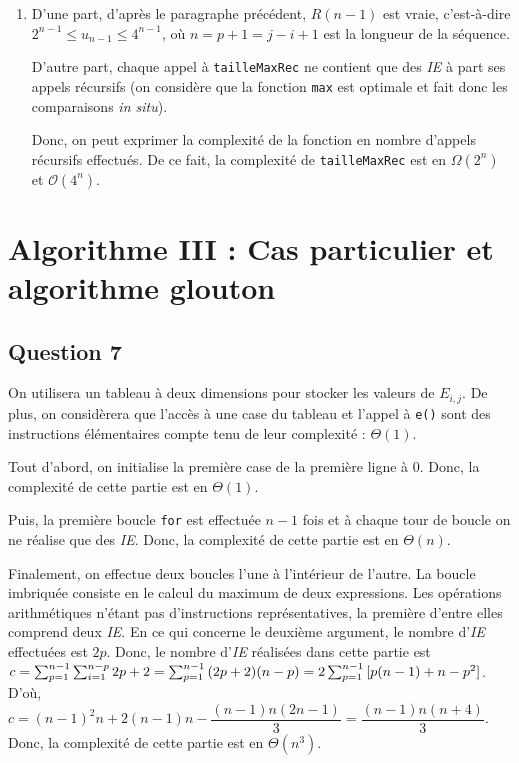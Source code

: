 \documentclass[12pt,a4paper]{article}
\begin{document}
\begin{enumerate}
\item D'une part, d'apr\`es le paragraphe pr\'ec\'edent, $R(n-1)$ est vraie, c'est-\`a-dire \( 2^{n-1} \leq u_{n-1} \leq 4^{n-1} \), o\`u \( n = p+1=j-i+1 \) est la longueur de la s\'equence. 

D'autre part, chaque appel \`a \texttt{tailleMaxRec} ne contient que des {\itshape IE} \`a part ses appels r\'ecursifs (on consid\`ere que la fonction \texttt{max} est optimale et fait donc les comparaisons {\itshape in situ}).

Donc, on peut exprimer la complexit\'e de la fonction en nombre d'appels r\'ecursifs effectu\'es. De ce fait, la complexit\'e de \texttt{tailleMaxRec} est en $\Omega(2^n)$ et $\mathcal{O}(4^n)$.
\end{enumerate}

\section{Algorithme III : Cas particulier et algorithme glouton}

\subsection*{Question 7}
On utilisera un tableau \`a deux dimensions pour stocker les valeurs de \( E_{i,j} \). De plus, on consid\`erera que l'acc\`es \`a une case du tableau et l'appel \`a \texttt{e()} sont des instructions \'el\'ementaires  compte tenu de leur complexit\'e : $\Theta(1)$. 

Tout d'abord, on initialise la premi\`ere case de la premi\`ere ligne \`a 0. Donc, la complexit\'e de cette partie est en $\Theta(1)$. 

Puis, la premi\`ere boucle \texttt{for} est effectu\'ee \( n-1 \) fois et \`a chaque tour de boucle on ne r\'ealise que des {\itshape IE}. Donc, la complexit\'e de cette partie est en $\Theta(n)$. 

Finalement, on effectue deux boucles l'une \`a l'int\'erieur de l'autre. La boucle imbriqu\'ee consiste en le calcul du maximum de deux expressions. Les op\'erations arithm\'etiques n'\'etant pas d'instructions repr\'esentatives, la premi\`ere d'entre elles comprend deux {\itshape IE}. En ce qui concerne le deuxi\`eme argument, le nombre d'{\itshape IE} effectu\'ees est \( 2p \). Donc, le nombre d'{\itshape IE} r\'ealis\'ees dans cette partie est \( \\c = \sum_{p=1}^{n-1}\sum_{i=1}^{n-p}{2p+2} = \sum_{p=1}^{n-1}{(2p+2)(n-p)} = 2\sum_{p=1}^{n-1}{[p(n-1)+n-p^2]} \). D'o\`u, \( c = (n-1)^2n + 2(n-1)n - \dfrac{(n-1)n(2n-1)}{3} = \dfrac{(n-1)n(n+4)}{3} \). Donc, la complexit\'e de cette partie est en $\Theta(n^3)$.
\end{document}
